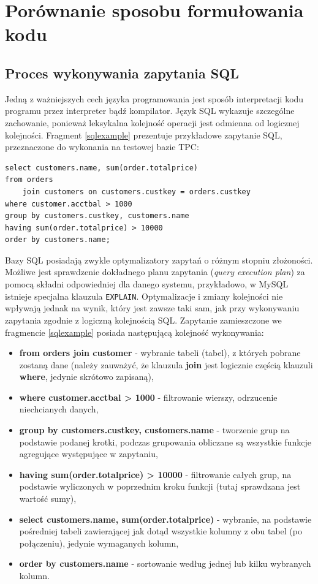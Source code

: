 \documentclass[12pt]{extarticle}
\begin{document}
\section{Porównanie sposobu formułowania kodu}

\subsection{Proces wykonywania zapytania SQL}

    Jedną z ważniejszych cech języka programowania jest sposób interpretacji kodu programu przez interpreter bądź kompilator. Język SQL wykazuje szczególne zachowanie, ponieważ leksykalna kolejność operacji jest odmienna od logicznej kolejności. Fragment \ref{sqlexample} prezentuje przykładowe zapytanie SQL, przeznaczone do wykonania na testowej bazie TPC:


\begin{lstlisting}[label=sqlexample, caption=Przykład kolejności wykonywania zapytania SQL]
select customers.name, sum(order.totalprice)
from orders 
    join customers on customers.custkey = orders.custkey
where customer.acctbal > 1000
group by customers.custkey, customers.name
having sum(order.totalprice) > 10000
order by customers.name;
\end{lstlisting}

    Bazy SQL posiadają zwykle optymalizatory zapytań o różnym stopniu złożoności. Możliwe jest sprawdzenie dokładnego planu zapytania (\textit{query execution plan}) za pomocą składni odpowiedniej dla danego systemu, przykładowo, w MySQL istnieje specjalna klauzula \texttt{EXPLAIN}. Optymalizacje i zmiany kolejności nie wpływają jednak na wynik, który jest zawsze taki sam, jak przy wykonywaniu zapytania zgodnie z logiczną kolejnością SQL. Zapytanie zamieszczone we fragmencie \ref{sqlexample} posiada następującą kolejność wykonywania:

\begin{itemize}
    \item \textbf{from orders join customer} - wybranie tabeli (tabel), z których pobrane zostaną dane (należy zauważyć, że klauzula \textbf{join} jest logicznie częścią klauzuli \textbf{where}, jedynie skrótowo zapisaną),
    \item \textbf{where customer.acctbal > 1000} - filtrowanie wierszy, odrzucenie niechcianych danych,
    \item \textbf{group by customers.custkey, customers.name} - tworzenie grup na podstawie podanej krotki, podczas grupowania obliczane są wszystkie funkcje agregujące występujące w zapytaniu,
    \item \textbf{having sum(order.totalprice) > 10000} - filtrowanie całych grup, na podstawie wyliczonych w poprzednim kroku funkcji (tutaj sprawdzana jest wartość sumy),
    \item \textbf{select customers.name, sum(order.totalprice)} - wybranie, na podstawie pośredniej tabeli zawierającej jak dotąd wszystkie kolumny z obu tabel (po połączeniu), jedynie wymaganych kolumn,
    \item \textbf{order by customers.name} - sortowanie według jednej lub kilku wybranych kolumn.
\end{itemize}
\end{document}
